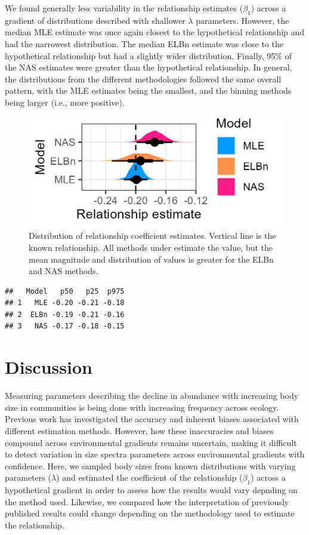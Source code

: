 \documentclass[
]{article}
\begin{document}
We found generally less variability in the relationship estimates
(\(\beta_1\)) across a gradient of distributions described with
shallower \(\lambda\) parameters. However, the median MLE estimate was
once again closest to the hypothetical relationship and had the
narrowest distribution. The median ELBn estimate was close to the
hypothetical relationship but had a slightly wider distribution.
Finally, 95\% of the NAS estimates were greater than the hypothetical
relationship. In general, the distributions from the different
methodologies followed the same overall pattern, with the MLE estimates
being the smallest, and the binning methods being larger (i.e., more
positive).

\begin{figure}
\centering
\includegraphics{figures/PLB_shallow_lambda_relationship_density.png}
\caption{Distribution of relationship coefficient estimates. Vertical
line is the known relationship. All methods under estimate the value,
but the mean magnitude and distribution of values is greater for the
ELBn and NAS methods.}
\end{figure}

\begin{verbatim}
##   Model   p50   p25  p975
## 1   MLE -0.20 -0.21 -0.18
## 2  ELBn -0.19 -0.21 -0.16
## 3   NAS -0.17 -0.18 -0.15
\end{verbatim}

\newpage

\hypertarget{discussion}{%
\section{Discussion}\label{discussion}}

Measuring parameters describing the decline in abundance with increasing
body size in communities is being done with increasing frequency across
ecology. Previous work has investigated the accuracy and inherent biases
associated with different estimation methods. However, how these
inaccuracies and biases compound across environmental gradients remains
uncertain, making it difficult to detect variation in size spectra
parameters across environmental gradients with confidence. Here, we
sampled body sizes from known distributions with varying parameters
(\(\lambda\)) and estimated the coefficient of the relationship
(\(\beta_1\)) across a hypothetical gradient in order to assess how the
results would vary depnding on the method used. Likewise, we compared
how the interpretation of previously published results could change
depending on the methodology used to estimate the relationship.
\end{document}
